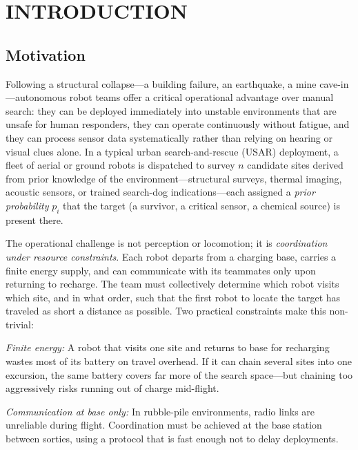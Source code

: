\chapter{INTRODUCTION}\label{ch:intro}

\begin{doublespacing}

\section{Motivation}

Following a structural collapse---a building failure, an earthquake, a
mine cave-in---autonomous robot teams offer a critical operational
advantage over manual search: they can be deployed immediately into
unstable environments that are unsafe for human responders, they can
operate continuously without fatigue, and they can process sensor data
systematically rather than relying on hearing or visual clues alone.
In a typical urban search-and-rescue (USAR) deployment, a fleet of
aerial or ground robots is dispatched to survey $n$ candidate sites
derived from prior knowledge of the environment---structural surveys,
thermal imaging, acoustic sensors, or trained search-dog
indications---each assigned a \emph{prior probability} $p_i$ that the target
(a survivor, a critical sensor, a chemical source) is present there.

The operational challenge is not perception or locomotion; it is
\emph{coordination under resource constraints}.
Each robot departs from a charging base, carries a finite energy
supply, and can communicate with its teammates only upon returning to
recharge.
The team must collectively determine which robot visits which site,
and in what order, such that the first robot to locate the target has
traveled as short a distance as possible.
Two practical constraints make this non-trivial:

\emph{Finite energy:}  A robot that visits one site and returns to base
for recharging wastes most of its battery on travel overhead.
If it can chain several sites into one excursion, the same battery
covers far more of the search space---but chaining too aggressively
risks running out of charge mid-flight.

\emph{Communication at base only:}  In rubble-pile environments, radio
links are unreliable during flight.
Coordination must be achieved at the base station between sorties,
using a protocol that is fast enough not to delay deployments.


\end{doublespacing}
